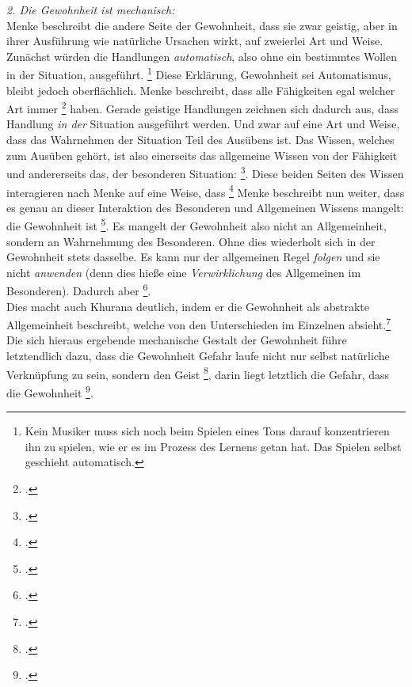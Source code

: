 \documentclass[12pt, a4paper, openany]{report}
\begin{document}
\emph{2. Die Gewohnheit ist mechanisch:}\\
Menke beschreibt die andere Seite der Gewohnheit, dass sie zwar geistig, aber in ihrer Ausführung wie natürliche Ursachen wirkt, auf zweierlei Art und Weise.
Zunächst würden die Handlungen \emph{automatisch}, also ohne ein bestimmtes Wollen in der Situation, ausgeführt.
\footnote{Kein Musiker muss sich noch beim Spielen eines Tons darauf konzentrieren ihn zu spielen, wie er es im Prozess des Lernens getan hat. 
Das Spielen selbst geschieht automatisch.}
Diese Erklärung, Gewohnheit sei Automatismus, bleibt jedoch oberflächlich.
Menke beschreibt, dass alle Fähigkeiten egal welcher Art immer \footcite[][132]{menke_autonomie_2018} haben. 
Gerade geistige Handlungen zeichnen sich dadurch aus, dass Handlung \emph{in der} Situation ausgeführt werden.
Und zwar auf eine Art und Weise, dass das Wahrnehmen der Situation Teil des Ausübens ist. 
Das Wissen, welches zum Ausüben gehört, ist also einerseits das allgemeine Wissen von der Fähigkeit und andererseits das, der besonderen Situation: \footcite[][133]{menke_autonomie_2018}.
Diese beiden Seiten des Wissen interagieren nach Menke auf eine Weise, dass \footcite[][133]{menke_autonomie_2018}
Menke beschreibt nun weiter, dass es genau an dieser Interaktion des Besonderen und Allgemeinen Wissens mangelt:
die Gewohnheit ist \footcite[][§410 Zusatz, S. 188]{hegel_enzyklopädie_1969}.
Es mangelt der Gewohnheit also nicht an Allgemeinheit, sondern an Wahrnehmung des Besonderen.
Ohne dies wiederholt sich in der Gewohnheit stets dasselbe.
Es kann nur der allgemeinen Regel \emph{folgen} und sie nicht \emph{anwenden} (denn dies hieße eine \emph{Verwirklichung} des Allgemeinen im Besonderen). 
Dadurch aber \footcite[][134]{menke_autonomie_2018}.\\
Dies macht auch Khurana deutlich, indem er die Gewohnheit als abstrakte Allgemeinheit beschreibt, welche von den Unterschieden im Einzelnen absieht.\footcite[Vgl.][431]{khurana_freiheit_2017}
Die sich hieraus ergebende mechanische Gestalt der Gewohnheit führe letztendlich dazu, dass die Gewohnheit Gefahr laufe nicht nur selbst natürliche Verknüpfung zu sein, sondern den Geist \footcite[][430]{khurana_freiheit_2017}, darin liegt letztlich die Gefahr, dass die Gewohnheit \footcite[][§410 (Anmerkung), S. 189]{khurana_freiheit_2017}.
\end{document}
